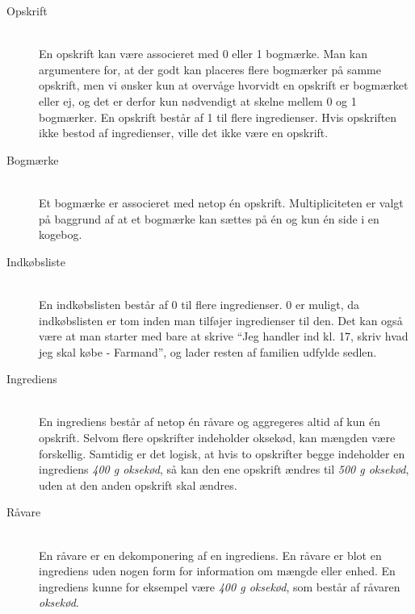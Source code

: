 \begin{description}
\item[Opskrift] \hfill \\
En opskrift kan være associeret med 0 eller 1 bogmærke. Man kan argumentere for, at der godt kan placeres flere bogmærker på samme opskrift, men vi ønsker kun at overvåge hvorvidt en opskrift er bogmærket eller ej, og det er derfor kun nødvendigt at skelne mellem 0 og 1 bogmærker. En opskrift består af 1 til flere ingredienser. Hvis opskriften ikke bestod af ingredienser, ville det ikke være en opskrift.
    
\item[Bogmærke] \hfill \\
Et bogmærke er associeret med netop én opskrift. Multipliciteten er valgt på baggrund af at et bogmærke kan sættes på én og kun én side i en kogebog.

\item[Indkøbsliste] \hfill \\
En indkøbslisten består af 0 til flere ingredienser. 0 er muligt, da indkøbslisten er tom inden man tilføjer ingredienser til den. Det kan også være at man starter med bare at skrive ``Jeg handler ind kl. 17, skriv hvad jeg skal købe - Farmand'', og lader resten af familien udfylde sedlen.

\item[Ingrediens] \hfill \\
  En ingrediens består af netop én råvare og aggregeres altid af kun én opskrift. Selvom flere opskrifter indeholder oksekød, kan mængden være forskellig. Samtidig er det logisk, at hvis to opskrifter begge indeholder en ingrediens \textit{400 g oksekød}, så kan den ene opskrift ændres til \textit{500 g oksekød}, uden at den anden opskrift skal ændres.

\item[Råvare] \hfill \\
  En råvare er en dekomponering af en ingrediens. En råvare er blot en ingrediens uden nogen form for information om mængde eller enhed. En ingrediens kunne for eksempel være \textit{400 g oksekød}, som består af råvaren \textit{oksekød}.
\end{description}

